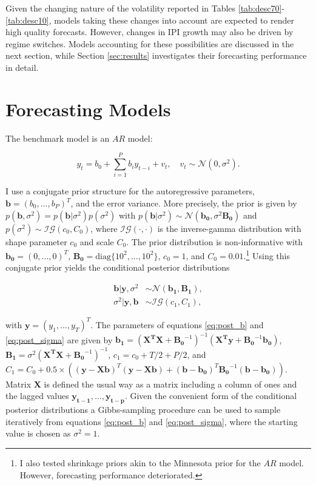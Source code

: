 \documentclass[12pt,letterpaper,fleqn]{article}           %
\begin{document}
Given the changing nature of the volatility reported in Tables \ref{tab:desc70}-\ref{tab:desc10}, models taking these changes into account are expected to render high quality forecasts. However, changes in IPI growth may also be driven by regime switches. Models accounting for these possibilities are discussed in the next section, while Section \ref{sec:results} investigates their forecasting performance in detail.


\section{Forecasting Models}
\label{sec:models}

The benchmark model is an $AR$ model:

\begin{equation}
y_t = b_0 + \sum_{i=1}^P b_i y_{t-i} + v_t, \quad v_t \sim \mathcal{N}(0, \sigma^2).
\label{eq:AR}
\end{equation}

I use a conjugate prior structure for the autoregressive parameters, $\bm{b} = (b_0,\ldots,b_P)^T$, and the error variance. More precisely, the prior is given by $p(\bm{b}, \sigma^2) = p(\bm{b}|\sigma^2)p(\sigma^2)$ with $p(\bm{b}|\sigma^2) \sim \mathcal{N}(\bm{b_0}, \sigma^2 \bm{B_0})$ and $p(\sigma^2) \sim \mathcal{IG}(c_0, C_0)$, where $\mathcal{IG}(\cdot,\cdot)$ is the inverse-gamma distribution with shape parameter $c_0$ and scale $C_0$. The prior distribution is non-informative with $\bm{b_0} = (0,\ldots,0)^T$, $\bm{B_0} = \mbox{diag}\{10^{2}, \ldots, 10^{2}\}$, $c_0 = 1$, and $C_0 = 0.01$.\footnote{I also tested shrinkage priors akin to the Minnesota prior for the $AR$ model. However, forecasting performance deteriorated.} Using this conjugate prior yields the conditional posterior distributions

\begin{align}
\bm{b}|\bm{y},\sigma^2 &\sim \mathcal{N}(\bm{b_1}, \bm{B_1}), \label{eq:post_b} \\
\sigma^2|\bm{y},\bm{b} &\sim \mathcal{IG}(c_1, C_1), \label{eq:post_sigma}
\end{align} 

with $\bm{y} = (y_1,\ldots,y_T)^T$. The parameters of equations \eqref{eq:post_b} and \eqref{eq:post_sigma} are given by $\bm{b_1} = (\bm{X^TX} + \bm{B_0}^{-1})^{-1}(\bm{X^Ty} + \bm{B_0}^{-1}\bm{b_0})$, $\bm{B_1} = \sigma^2(\bm{X^TX} + \bm{B_0}^{-1})^{-1}$, $c_1 = c_0 + T/2 + P/2$, and $C_1 = C_0 + 0.5 \times ((\bm{y} - \bm{X}\bm{b})^T(\bm{y} - \bm{X}\bm{b}) + (\bm{b} - \bm{b_0})^T\bm{B_0}^{-1}(\bm{b} - \bm{b_0}))$. Matrix $\bm{X}$ is defined the usual way as a matrix including a column of ones and the lagged values $\bm{y_{t-1}},\ldots,\bm{y_{t-p}}$.%
Given the convenient form of the conditional posterior distributions a Gibbs-sampling procedure can be used to sample iteratively from equations \eqref{eq:post_b} and \eqref{eq:post_sigma}, where the starting value is chosen as $\sigma^2 = 1$.
\end{document}
